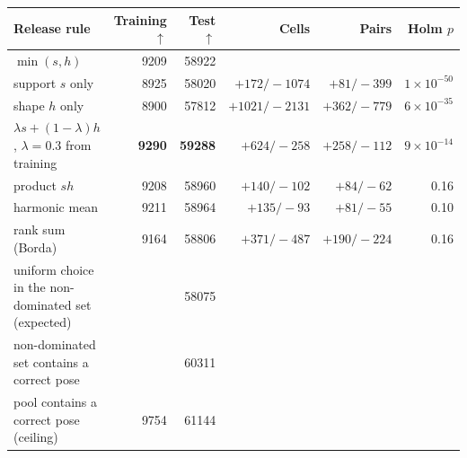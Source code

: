 \begin{tabular}{lrrrrr}
\toprule
Release rule & Training $\uparrow$ & Test $\uparrow$ & Cells & Pairs & Holm $p$ \\
\midrule
$\min(s,h)$ & 9209 & 58922 &  &  &  \\
support $s$ only & 8925 & 58020 & $+172/-1074$ & $+81/-399$ & $1\times10^{-50}$ \\
shape $h$ only & 8900 & 57812 & $+1021/-2131$ & $+362/-779$ & $6\times10^{-35}$ \\
$\lambda s+(1-\lambda)h$, $\lambda=0.3$ from training & \textbf{9290} & \textbf{59288} & $+624/-258$ & $+258/-112$ & $9\times10^{-14}$ \\
product $sh$ & 9208 & 58960 & $+140/-102$ & $+84/-62$ & 0.16 \\
harmonic mean & 9211 & 58964 & $+135/-93$ & $+81/-55$ & 0.10 \\
rank sum (Borda) & 9164 & 58806 & $+371/-487$ & $+190/-224$ & 0.16 \\
\midrule
uniform choice in the non-dominated set (expected) & & 58075 & & & \\
non-dominated set contains a correct pose & & 60311 & & & \\
pool contains a correct pose (ceiling) & 9754 & 61144 & & & \\
\bottomrule
\end{tabular}

